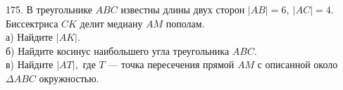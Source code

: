 175. В треугольнике $ABC$ известны длины двух сторон $|AB|=6,\ |AC|=4.$ Биссектриса $CK$ делит медиану $AM$ пополам.\\
а) Найдите $|AK|.$\\
б) Найдите косинус наибольшего угла треугольника $ABC.$\\
в) Найдите $|AT|,$ где $T$ --- точка пересечения прямой $AM$ с описанной около $\Delta ABC$ окружностью.\\
